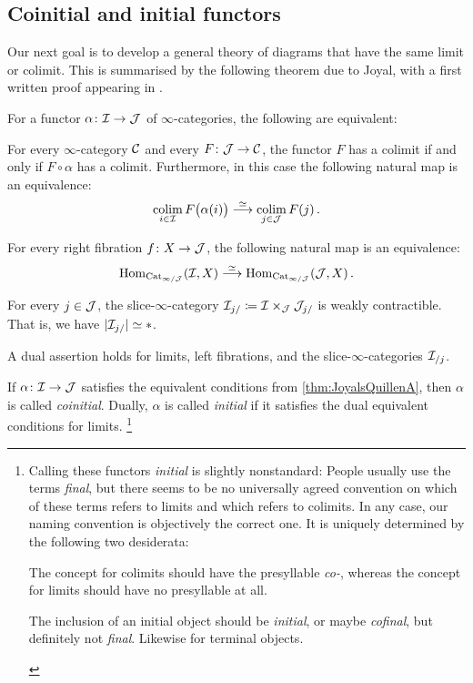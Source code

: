 \subsection{Coinitial and initial functors}
Our next goal is to develop a general theory of diagrams that have the same limit or colimit. This is summarised by the following theorem due to Joyal, with a first written proof appearing in \cite[Theorem~]{HTT}.
\begin{thm}\label{thm:JoyalsQuillenA}
	For a functor $\alpha\colon\mathcal{I}\rightarrow \mathcal{J}$ of $\infty$-categories, the following are equivalent:
	\begin{alphanumerate}
		\item For every $\infty$-category $\mathcal{C}$ and every $F\colon \mathcal{J}\rightarrow \mathcal{C}$, the functor $F$ has a colimit if and only if $F\circ \alpha$ has a colimit. Furthermore, in this case the following natural map is an equivalence:\label{enum:Cofinal}
		\begin{equation*}
			\operatorname*{colim}_{i\in\mathcal{I}}F\bigl(\alpha(i)\bigr)\overset{\simeq}{\longrightarrow}\operatorname*{colim}_{j\in\mathcal{J}}F(j)\,.
		\end{equation*}
		\item For every right fibration $f\colon X\rightarrow\mathcal{J}$, the following natural map 
		is an equivalence:\label{enum:RightAnodyne}
		\begin{equation*}
			\operatorname{Hom}_{\mathrm{Cat}_{\infty/\mathcal{J}}}(\mathcal{I},X)\overset{\simeq}{\longrightarrow} \operatorname{Hom}_{\mathrm{Cat}_{\infty/\mathcal{J}}}(\mathcal{J},X)\,.
		\end{equation*}
		\item For every $j\in\mathcal{J}$, the slice-$\infty$-category $\mathcal{I}_{j/}\coloneqq \mathcal{I}\times_{\mathcal{J}}\mathcal{J}_{j/}$ is weakly contractible. That is, we have $\abs{\Ii_{j/}}\simeq *$.\label{enum:WeaklyContractible}
	\end{alphanumerate}
	A dual assertion holds for limits, left fibrations, and the slice-$\infty$-categories $\mathcal{I}_{/j}$.
\end{thm}
\begin{defi}
	If $\alpha\colon \mathcal{I}\rightarrow\mathcal{J}$ satisfies the equivalent conditions from \cref{thm:JoyalsQuillenA}, then $\alpha$ is called \emph{coinitial}. Dually, $\alpha$ is called \emph{initial} if it satisfies the dual equivalent conditions for limits.%
	\footnote{Calling these functors \emph{initial} is slightly nonstandard: People usually use the terms \emph{final}, but there seems to be no universally agreed convention on which of these terms refers to limits and which refers to colimits. In any case, our naming convention is objectively the correct one. It is uniquely determined by the following two desiderata:
	\begin{alphanumerate}
		\item The concept for colimits should have the presyllable \emph{co-}, whereas the concept for limits should have no presyllable at all.
		\item The inclusion of an initial object should be \emph{initial}, or maybe \emph{cofinal}, but definitely not \emph{final}. Likewise for terminal objects.
		\end{alphanumerate}}
\end{defi}
